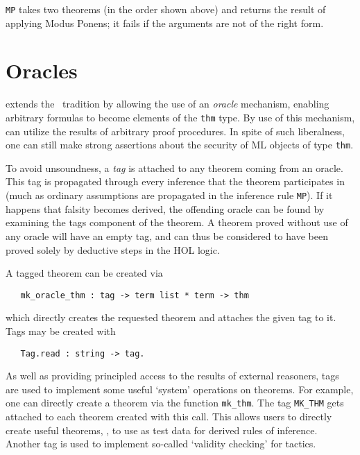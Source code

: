 \noindent
{\small\verb+MP+} takes two theorems (in the order shown above) and returns
the result of applying Modus Ponens; it fails if the arguments are not of the
right form.

\section{Oracles}

\HOL{} extends the \LCF\ tradition by allowing the use of an \emph
{oracle} mechanism, enabling arbitrary formulas to become elements of
the \verb+thm+ type. By use of this mechanism, \HOL{} can utilize the
results of arbitrary proof procedures. In spite of such liberalness, one
can still make strong assertions about the security of ML objects of
type \verb+thm+.

To avoid unsoundness, a \emph{tag} is attached to any theorem
coming from an oracle. This tag is propagated through every
inference that the theorem participates in (much as ordinary assumptions
are propagated in the inference rule {\small\verb+MP+}). If it happens
that falsity becomes derived, the offending oracle can be found by
examining the tags component of the theorem. A theorem proved without
use of any oracle will have an empty tag, and can thus be considered to
have been proved solely by deductive steps in the HOL logic.

A tagged theorem can be created via

\begin{boxed}
\begin{verbatim}
   mk_oracle_thm : tag -> term list * term -> thm
\end{verbatim}
\end{boxed}

which directly creates the requested theorem and attaches the given tag to
it. Tags may be created with

\begin{boxed}
\begin{verbatim}
   Tag.read : string -> tag.
\end{verbatim}\end{boxed}

As well as providing principled access to the results of external
reasoners, tags are used to implement some useful `system' operations on
theorems. For example, one can directly create a theorem via the function
\verb+mk_thm+. The tag \verb+MK_THM+ gets attached to each theorem
created with this call. This allows users to directly create useful
theorems, \eg, to use as test data for derived rules of inference.
Another tag is used to implement so-called `validity checking' for tactics.

